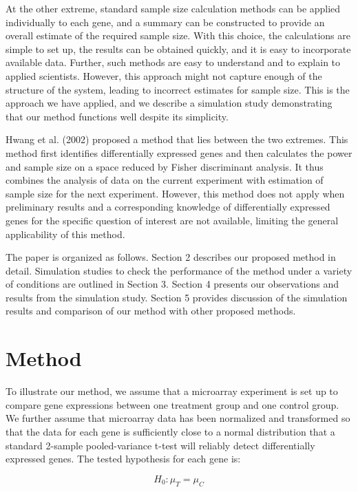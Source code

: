 \documentclass{bioinfo}
\begin{document}
At the other extreme, standard sample size calculation methods can
be applied individually to each gene, and a summary can be
constructed to provide an overall estimate of the required sample
size.  With this choice, the calculations are simple to set up,
the results can be obtained quickly, and it is easy to incorporate
available data. Further, such methods are easy to understand and
to explain to applied scientists.  However, this approach might
not capture enough of the structure of the system, leading to
incorrect estimates for sample size.  This is the approach we have
applied, and we describe a simulation study demonstrating that our
method functions well despite its simplicity.

Hwang et al. (2002) proposed a method that lies between the two
extremes.  This method first identifies differentially expressed
genes and then calculates the power and sample size on a space
reduced by Fisher discriminant analysis. It thus combines the
analysis of data on the current experiment with estimation of sample
size for the next experiment. However, this method does not apply
when preliminary results and a corresponding knowledge of
differentially expressed genes for the specific question of interest
are not available, limiting the general applicability of this
method.

The paper is organized as follows. Section 2 describes our proposed
method in detail. Simulation studies to check the performance of the
method under a variety of conditions are outlined in Section 3.
Section 4 presents our observations and results from the simulation
study.  Section 5 provides discussion of the simulation results and
comparison of our method with other proposed methods.

\section{Method}
To illustrate our method, we assume that a microarray experiment is
set up to compare gene expressions between one treatment group and
one control group. We further assume that microarray data has been
normalized and transformed so that the data for each gene is
sufficiently close to a normal distribution that a standard 2-sample
pooled-variance t-test will reliably detect differentially expressed
genes. The tested hypothesis for each gene is:

\begin{equation}
  H_0: \mu_{T} = \mu_{C}  \nonumber
\end{equation}
\end{document}
